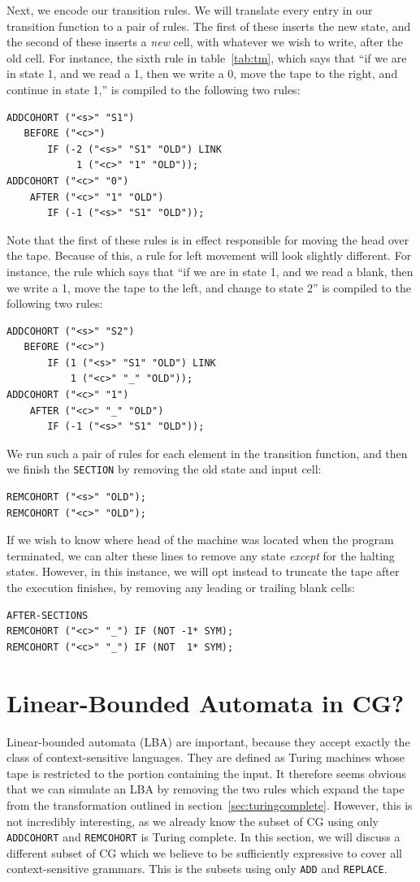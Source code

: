 \documentclass[11pt]{article}
\def\t#1{\texttt{#1}}
\begin{document}
Next, we encode our transition rules. We will translate every entry in our
transition function to a pair of rules. The first of these inserts the new 
state, and the second of these inserts a \emph{new} cell, with whatever we wish
to write, after the old cell. For instance, the sixth rule in
table~\ref{tab:tm}, which says that ``if we are in state 1, and we read a 1,
then we write a 0, move the tape to the right, and continue in state 1,'' is
compiled to the following two rules:
\begin{Verbatim}
ADDCOHORT ("<s>" "S1")
   BEFORE ("<c>")
       IF (-2 ("<s>" "S1" "OLD") LINK 
            1 ("<c>" "1" "OLD"));
ADDCOHORT ("<c>" "0")
    AFTER ("<c>" "1" "OLD")
       IF (-1 ("<s>" "S1" "OLD"));
\end{Verbatim}
Note that the first of these rules is in effect responsible for moving the head
over the tape. Because of this, a rule for left movement will look slightly
different. For instance, the rule which says that ``if we are in state 1, and we
read a blank, then we write a 1, move the tape to the left, and change to state
2'' is compiled to the following two rules:
\begin{Verbatim}
ADDCOHORT ("<s>" "S2")
   BEFORE ("<c>")
       IF (1 ("<s>" "S1" "OLD") LINK
           1 ("<c>" "_" "OLD"));
ADDCOHORT ("<c>" "1")
    AFTER ("<c>" "_" "OLD")
       IF (-1 ("<s>" "S1" "OLD"));
\end{Verbatim}
We run such a pair of rules for each element in the transition function, and
then we finish the \t{SECTION} by removing the old state and input cell:
\begin{Verbatim}
REMCOHORT ("<s>" "OLD");
REMCOHORT ("<c>" "OLD");
\end{Verbatim}
If we wish to know where head of the machine was located when the program
terminated, we can alter these lines to remove any state \emph{except} for the
halting states. However, in this instance, we will opt instead to truncate the
tape after the execution finishes, by removing any leading or trailing blank
cells:
\begin{Verbatim}
AFTER-SECTIONS
REMCOHORT ("<c>" "_") IF (NOT -1* SYM);
REMCOHORT ("<c>" "_") IF (NOT  1* SYM);
\end{Verbatim}

\section{Linear-Bounded Automata in CG?}
Linear-bounded automata (LBA) are important, because they accept exactly the
class of context-sensitive languages. They are defined as Turing machines whose
tape is restricted to the portion containing the input.
It therefore seems obvious that we can simulate an LBA by removing the two
rules which expand the tape from the transformation outlined in
section~\ref{sec:turingcomplete}. However, this is not incredibly interesting,
as we already know the subset of CG using only \t{ADDCOHORT} and \t{REMCOHORT}
is Turing complete. In this section, we will discuss a different subset of CG
which we believe to be sufficiently expressive to cover all context-sensitive
grammars. This is the subsets using only \t{ADD} and \t{REPLACE}.
\end{document}
